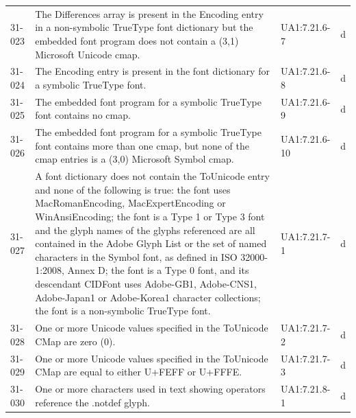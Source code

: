 \documentclass{book}
\begin{document}
\begin{tabular}{lp{5cm}lp{5cm}}
  31-023 & The Differences array is present in the Encoding entry in a non-symbolic TrueType font dictionary but the embedded font program does not contain a (3,1) Microsoft Unicode cmap. & UA1:7.21.6-7 & d\\
  31-024 & The Encoding entry is present in the font dictionary for a symbolic TrueType font. & UA1:7.21.6-8 & d\\
  31-025 & The embedded font program for a symbolic TrueType font contains no cmap. & UA1:7.21.6-9 & d\\
  31-026 & The embedded font program for a symbolic TrueType font contains more than one cmap, but none of the cmap entries is a (3,0) Microsoft Symbol cmap. & UA1:7.21.6-10 & d\\
  31-027 & A font dictionary does not contain the ToUnicode entry and none of the following is true: the font uses MacRomanEncoding, MacExpertEncoding or WinAnsiEncoding; the font is a Type 1 or Type 3 font and the glyph names of the glyphs referenced are all contained in the Adobe Glyph List or the set of named characters in the Symbol font, as defined in ISO 32000-1:2008, Annex D; the font is a Type 0 font, and its descendant CIDFont uses Adobe-GB1, Adobe-CNS1, Adobe-Japan1 or Adobe-Korea1 character collections; the font is a non-symbolic TrueType font. & UA1:7.21.7-1 & d\\
  31-028 & One or more Unicode values specified in the ToUnicode CMap are zero (0). & UA1:7.21.7-2 & d\\
  31-029 & One or more Unicode values specified in the ToUnicode CMap are equal to either U+FEFF or U+FFFE. & UA1:7.21.7-3 & d\\
  31-030 & One or more characters used in text showing operators reference the .notdef glyph. & UA1:7.21.8-1 & d\\
\end{tabular}



\clearpage\pagestyle{empty}
\end{document}
